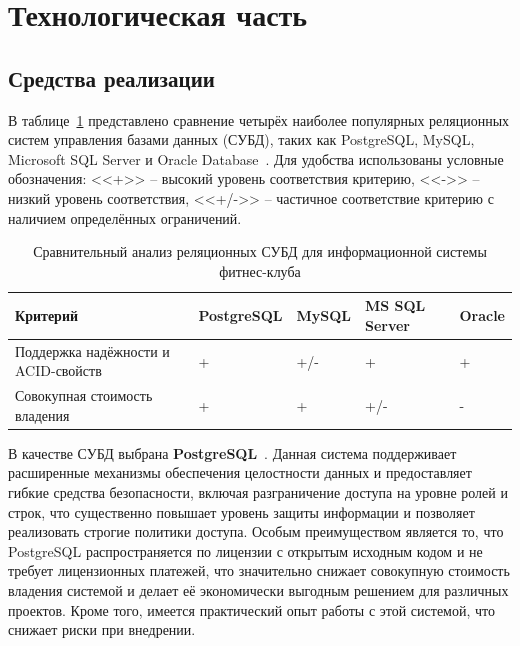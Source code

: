 \section{Технологическая часть}

\subsection{Средства реализации}

В таблице~\ref{tab:subd_comparison} представлено сравнение четырёх наиболее популярных реляционных систем управления базами данных (СУБД), таких как PostgreSQL, MySQL, Microsoft SQL Server и Oracle Database~\cite{DBEnginesRanking}. Для удобства использованы условные обозначения: <<+>> -- высокий уровень соответствия критерию, <<->> -- низкий уровень соответствия, <<+/->> -- частичное соответствие критерию с наличием определённых ограничений.

\begin{table}[h!]
	\centering
	\begin{tabular}{|p{5.2cm}|>{\centering\arraybackslash}p{3.0cm}|>{\centering\arraybackslash}p{2.0cm}|>{\centering\arraybackslash}p{2.3cm}|>{\centering\arraybackslash}p{2.3cm}|}
		\hline
		\textbf{Критерий} & \textbf{PostgreSQL} & \textbf{MySQL} & \textbf{MS SQL Server} & \textbf{Oracle} \\
		\hline
		Поддержка надёжности и ACID-свойств~\cite{Gray1981} & + & +/- & + & + \\
		\hline
		Совокупная стоимость владения & + & + & +/- & - \\
		\hline
	\end{tabular}
	\caption{Сравнительный анализ реляционных СУБД для информационной системы фитнес-клуба}
	\label{tab:subd_comparison}
\end{table}

В качестве СУБД выбрана \textbf{PostgreSQL}~\cite{postgresql}. Данная система поддерживает расширенные механизмы обеспечения целостности данных и предоставляет гибкие средства безопасности, включая разграничение доступа на уровне ролей и строк, что существенно повышает уровень защиты информации и позволяет реализовать строгие политики доступа. Особым преимуществом является то, что PostgreSQL распространяется по лицензии с открытым исходным кодом и не требует лицензионных платежей, что значительно снижает совокупную стоимость владения системой и делает её экономически выгодным решением для различных проектов. Кроме того, имеется практический опыт работы с этой системой, что снижает риски при внедрении.


